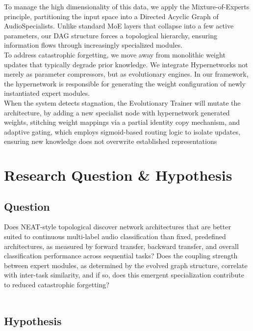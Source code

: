 \documentclass{article}
\begin{document}
\noindent To manage the high dimensionality of this data, we apply the Mixture-of-Experts principle, partitioning the input space into a Directed Acyclic Graph of AudioSpecialists. Unlike standard MoE layers that collapse into a few active parameters, our DAG structure forces a topological hierarchy, ensuring information flows through increasingly specialized modules. \\

\noindent To address catastrophic forgetting, we move away from monolithic weight updates that typically degrade prior knowledge. We integrate Hypernetworks not merely as parameter compressors, but as evolutionary engines. In our framework, the hypernetwork is responsible for generating the weight configuration of newly instantiated expert modules.\\

\noindent When the system detects stagnation, the Evolutionary Trainer will mutate the architecture, by adding a new specialist node with hypernetwork generated weights, stitching weight mappings via a partial identity copy mechanism, and adaptive gating, which employs sigmoid-based routing logic to isolate updates, ensuring new knowledge does not overwrite established representations

\section{Research Question & Hypothesis}

\subsection{Question}

Does NEAT-style topological discover network architectures that are better suited to continuous multi-label audio classification than fixed, predefined architectures, as measured by forward transfer, backward transfer, and overall classification performance across sequential tasks? Does the coupling strength between expert modules, as determined by the evolved graph structure, correlate with inter-task similarity, and if so, does this emergent specialization contribute to reduced catastrophic forgetting?\\\

\subsection{Hypothesis}
\end{document}
